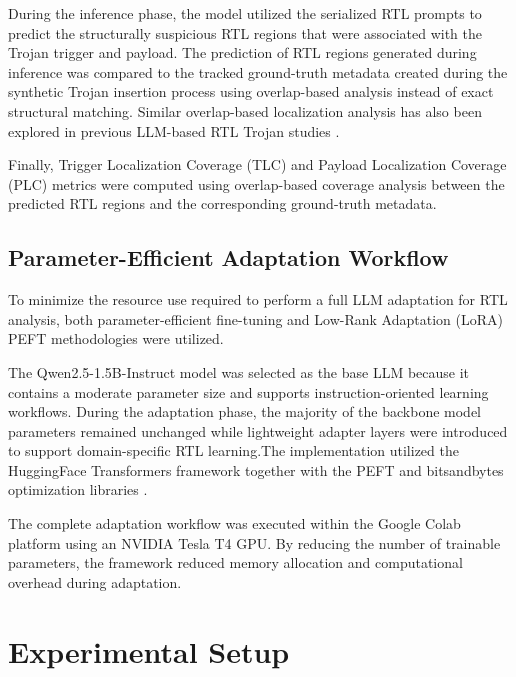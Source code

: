 \documentclass[conference]{IEEEtran}
\begin{document}
During the inference phase, the model utilized the serialized RTL prompts to predict the structurally suspicious RTL regions that were associated with the Trojan trigger and payload. The prediction of RTL regions generated during inference was compared to the tracked ground-truth metadata created during the synthetic Trojan insertion process using overlap-based analysis instead of exact structural matching. Similar overlap-based localization analysis has also been explored in previous LLM-based RTL Trojan studies \cite{kundu2025pearl,trojanwhisper}.

Finally, Trigger Localization Coverage (TLC) and Payload Localization Coverage (PLC) metrics were computed using overlap-based coverage analysis between the predicted RTL regions and the corresponding ground-truth metadata.

\subsection{Parameter-Efficient Adaptation Workflow}
\label{subsec:lora_workflow}

To minimize the resource use required to perform a full LLM adaptation for RTL analysis, both parameter-efficient fine-tuning and Low-Rank Adaptation (LoRA) PEFT methodologies were utilized.

The Qwen2.5-1.5B-Instruct model was selected as the base LLM because it contains a moderate parameter size and supports instruction-oriented learning workflows. During the adaptation phase, the majority of the backbone model parameters remained unchanged while lightweight adapter layers were introduced to support domain-specific RTL learning.The implementation utilized the HuggingFace Transformers framework together with the PEFT and bitsandbytes optimization libraries \cite{wolf2020transformers,peft,bitsandbytes}.

The complete adaptation workflow was executed within the Google Colab platform using an NVIDIA Tesla T4 GPU. By reducing the number of trainable parameters, the framework reduced memory allocation and computational overhead during adaptation.


\section{Experimental Setup}
\label{sec:experimental_setup}
\end{document}
